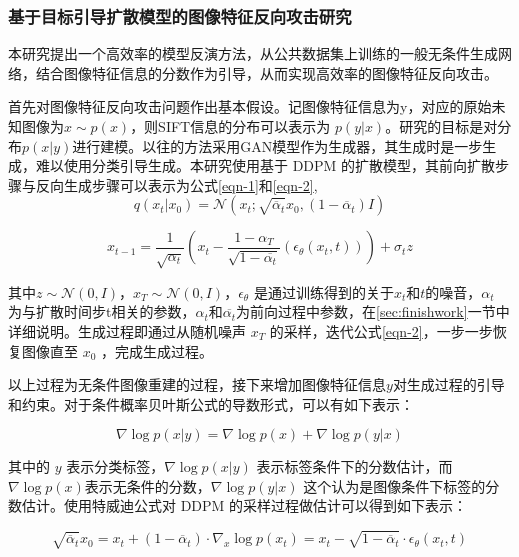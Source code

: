 \subsubsection{基于目标引导扩散模型的图像特征反向攻击研究}\label{sec:plan_1}
本研究提出一个高效率的模型反演方法，从公共数据集上训练的一般无条件生成网络，结合图像特征信息的分数作为引导，从而实现高效率的图像特征反向攻击。
\par
首先对图像特征反向攻击问题作出基本假设。记图像特征信息为y，对应的原始未知图像为$x \sim p(x)$，则SIFT信息的分布可以表示为 $p(y|x)$。研究的目标是对分布$p(x|y)$进行建模。以往的方法采用GAN模型作为生成器，其生成时是一步生成，难以使用分类引导生成。本研究使用基于 DDPM 的扩散模型，其前向扩散步骤与反向生成步骤可以表示为公式\eqref{eqn-1}和\eqref{eqn-2},
\begin{equation}\label{eqn-1}
      q(x_t|x_{0})=\mathcal{N}(x_t;\sqrt{\overline{\alpha}_t}x_{0},(1-\overline{\alpha}_t)I)
\end{equation}

\begin{equation}\label{eqn-2}
      x_{t-1}= \frac{1}{\sqrt{\alpha_t}}
      (x_t -
      \frac{1-\alpha_T}{\sqrt{1-\overline{\alpha_t}}}
      (\epsilon_\theta(x_t,t))) + \sigma_t z
\end{equation}

其中$z \sim \mathcal{N}(0,I)$，$x_T \sim \mathcal{N}(0,I)$，$\epsilon_\theta$ 是通过训练得到的关于$x_t$和$t$的噪音，$\alpha_t$ 为与扩散时间步t相关的参数，$\alpha_t$和$\overline{\alpha_t}$为前向过程中参数，在\ref{sec:finishwork}一节中详细说明。生成过程即通过从随机噪声 $x_T$ 的采样，迭代公式\eqref{eqn-2}，一步一步恢复图像直至 $x_0$ ，完成生成过程。
\par
以上过程为无条件图像重建的过程，接下来增加图像特征信息$y$对生成过程的引导和约束。对于条件概率贝叶斯公式的导数形式，可以有如下表示：

\begin{equation}\label{eqn-3}
      \nabla \log p(x|y) = \nabla \log p(x) + \nabla \log p(y|x)
\end{equation}

其中的 $y$ 表示分类标签，$\nabla \log p(x|y)$ 表示标签条件下的分数估计，而 $\nabla \log p(x)$表示无条件的分数，$\nabla \log p(y|x)$ 这个认为是图像条件下标签的分数估计。使用特威迪公式对 DDPM 的采样过程做估计可以得到如下表示：

\begin{equation}\label{eqn-4}
      \sqrt{\overline{\alpha}_t}x_0 = x_t + (1 - \overline{\alpha}_t) \cdot \nabla_x \log p(x_t) = x_t - \sqrt{1-\overline{\alpha}_t}\cdot\epsilon_\theta(x_t,t)
\end{equation}

